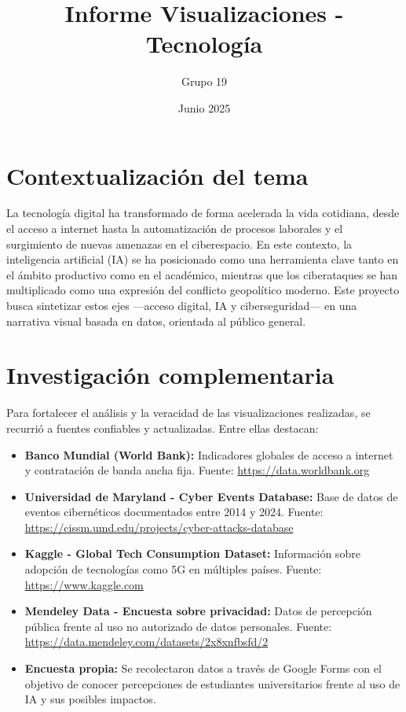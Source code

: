 \documentclass[12pt, a4paper]{article}
\title{Informe Visualizaciones - Tecnología}
\author{Grupo 19}
\date{Junio 2025}
\begin{document}
\maketitle
\section{Contextualización del tema}

La tecnología digital ha transformado de forma acelerada la vida cotidiana, desde el acceso a internet hasta la automatización de procesos laborales y el surgimiento de nuevas amenazas en el ciberespacio. En este contexto, la inteligencia artificial (IA) se ha posicionado como una herramienta clave tanto en el ámbito productivo como en el académico, mientras que los ciberataques se han multiplicado como una expresión del conflicto geopolítico moderno. Este proyecto busca sintetizar estos ejes —acceso digital, IA y ciberseguridad— en una narrativa visual basada en datos, orientada al público general.

\section{Investigación complementaria}

Para fortalecer el análisis y la veracidad de las visualizaciones realizadas, se recurrió a fuentes confiables y actualizadas. Entre ellas destacan:

\begin{itemize}
  \item \textbf{Banco Mundial (World Bank):} Indicadores globales de acceso a internet y contratación de banda ancha fija. Fuente: \url{https://data.worldbank.org}
  \item \textbf{Universidad de Maryland - Cyber Events Database:} Base de datos de eventos cibernéticos documentados entre 2014 y 2024. Fuente: \url{https://cissm.umd.edu/projects/cyber-attacks-database}
  \item \textbf{Kaggle - Global Tech Consumption Dataset:} Información sobre adopción de tecnologías como 5G en múltiples países. Fuente: \url{https://www.kaggle.com}
  \item \textbf{Mendeley Data - Encuesta sobre privacidad:} Datos de percepción pública frente al uso no autorizado de datos personales. Fuente: \url{https://data.mendeley.com/datasets/2x8xnfbsfd/2}
  \item \textbf{Encuesta propia:} Se recolectaron datos a través de Google Forms con el objetivo de conocer percepciones de estudiantes universitarios frente al uso de IA y sus posibles impactos.
\end{itemize}
\end{document}
